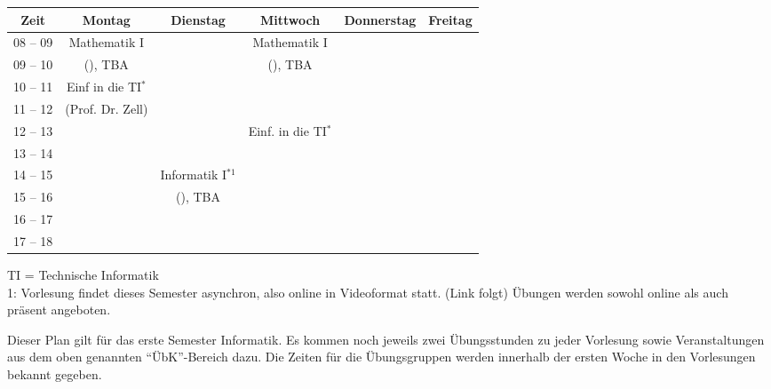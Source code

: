 \begin{minipage}{\textwidth}
    \footnotesize
\begin{center}
	\begin{tabular}{|c|c|c|c|c|c|}
	\hline
	 Zeit     &    Montag                    & Dienstag          & Mittwoch          	& Donnerstag & Freitag \\ \hline\hline
	 08 -- 09 &    Mathematik I              &                   & Mathematik I      	&  &  \\ \cline{1-1} \cline{3-3} \cline{5-6} 
	 09 -- 10 &    (\Matheprof), TBA         &                   & (\Matheprof), TBA 	&  &  \\ \hline
	 10 -- 11 &    Einf in die TI$^*$        &                   &                   	&  &  \\ \cline{1-1} \cline{3-6} 
	 11 -- 12 &    (Prof. Dr. Zell)          &                   &                   	&  &  \\ \hline
	 12 -- 13 &                              &                   & Einf. in die TI$^*$    	&  &  \\ \hline
	 13 -- 14 &                              &                   &                   	&  &  \\ \hline
	 14 -- 15 &                              & Informatik I$^{*1}$  &                   	&  &  \\ \cline{1-2} \cline{4-6} 
	 15 -- 16 &                              & (\Infoprof), TBA  &                   	&  &  \\ \hline
	 16 -- 17 &                              &                   &                   	&  &  \\ \hline
	 17 -- 18 &                              &                   &                   	&  &  \\ \hline
	\end{tabular}
	
\scriptsize TI = Technische Informatik\\
1: Vorlesung findet dieses Semester asynchron, also online in Videoformat statt. (Link folgt) Übungen werden sowohl online als auch präsent angeboten.\\

\end{center}
\end{minipage}
Dieser Plan gilt für das erste Semester Informatik. Es kommen noch jeweils zwei Übungsstunden zu jeder Vorlesung 
sowie Veranstaltungen aus dem oben genannten "`\"UbK"'-Bereich dazu.
Die Zeiten für die Übungsgruppen werden innerhalb der ersten Woche in den Vorlesungen bekannt gegeben.
